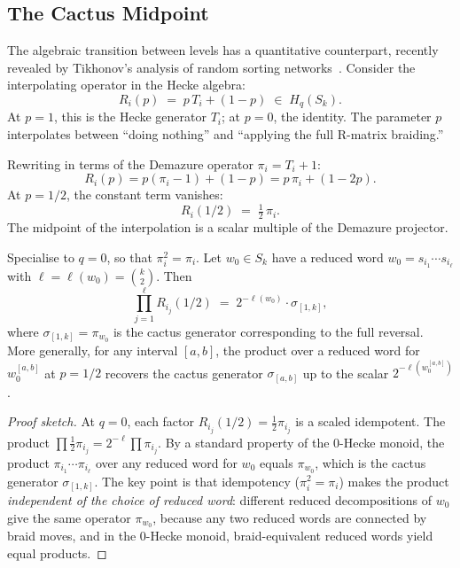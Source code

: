 \subsection{The Cactus Midpoint}
\label{sec:hierarchy-midpoint}

The algebraic transition between levels has a quantitative counterpart,
recently revealed by Tikhonov's analysis of random sorting
networks~\cite{tikhonov-2026}.  Consider the interpolating operator
in the Hecke algebra:
\begin{equation}
\label{eq:tikhonov-interp}
  R_i(p) \;=\; p\, T_i + (1-p) \;\in\; H_q(S_k).
\end{equation}
At $p = 1$, this is the Hecke generator $T_i$; at $p = 0$, the
identity.  The parameter $p$ interpolates between ``doing nothing''
and ``applying the full R-matrix braiding.''

Rewriting in terms of the Demazure operator $\pi_i = T_i + 1$:
\[
  R_i(p) = p(\pi_i - 1) + (1-p) = p\,\pi_i + (1 - 2p).
\]
At $p = 1/2$, the constant term vanishes:
\begin{equation}
\label{eq:midpoint}
  R_i(1/2) \;=\; \tfrac{1}{2}\,\pi_i.
\end{equation}
The midpoint of the interpolation is a scalar multiple of the Demazure
projector.

\begin{proposition}
\label{prop:cactus-midpoint}
Specialise to $q = 0$, so that $\pi_i^2 = \pi_i$.  Let $w_0 \in S_k$
have a reduced word $w_0 = s_{i_1} \cdots s_{i_\ell}$ with
$\ell = \ell(w_0) = \binom{k}{2}$.  Then
\begin{equation}
\label{eq:cactus-product}
  \prod_{j=1}^{\ell} R_{i_j}(1/2)
  \;=\; 2^{-\ell(w_0)} \cdot \sigma_{[1,k]},
\end{equation}
where $\sigma_{[1,k]} = \pi_{w_0}$ is the cactus generator
corresponding to the full reversal.  More generally, for any interval
$[a,b]$, the product over a reduced word for $w_0^{[a,b]}$ at
$p = 1/2$ recovers the cactus generator $\sigma_{[a,b]}$ up to
the scalar $2^{-\ell(w_0^{[a,b]})}$.
\end{proposition}

\begin{proof}[Proof sketch]
At $q = 0$, each factor $R_{i_j}(1/2) = \frac{1}{2}\pi_{i_j}$ is a
scaled idempotent.  The product
$\prod \frac{1}{2}\pi_{i_j} = 2^{-\ell} \prod \pi_{i_j}$.  By a
standard property of the $0$-Hecke monoid, the product
$\pi_{i_1} \cdots \pi_{i_\ell}$ over any reduced word for $w_0$
equals $\pi_{w_0}$, which is the cactus generator $\sigma_{[1,k]}$.
The key point is that idempotency ($\pi_i^2 = \pi_i$) makes the
product \emph{independent of the choice of reduced word}: different
reduced decompositions of $w_0$ give the same operator $\pi_{w_0}$,
because any two reduced words are connected by braid moves, and in the
$0$-Hecke monoid, braid-equivalent reduced words yield equal products.
\end{proof}

